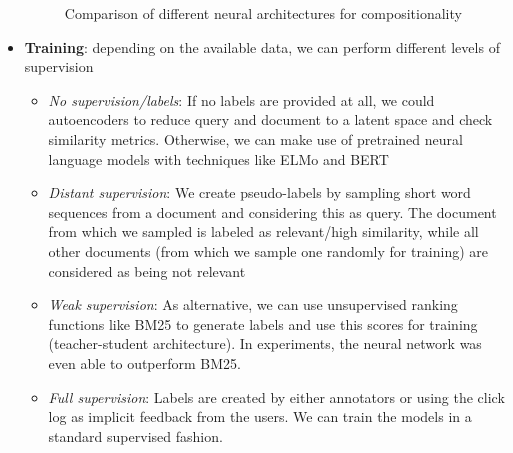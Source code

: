 \begin{itemize}
\begin{figure}[ht]
\begin{subfigure}[b]{0.3\textwidth}
			\label{img:neural_model_architecture_comparisons_two_dim_matching}
		\end{subfigure}
		\label{img:neural_model_architecture_comparisons}
		\caption{Comparison of different neural architectures for compositionality}
	\end{figure}
	\item \textbf{Training}: depending on the available data, we can perform different levels of supervision
	\begin{itemize}
		\item \textit{No supervision/labels}: If no labels are provided at all, we could autoencoders to reduce query and document to a latent space and check similarity metrics. Otherwise, we can make use of pretrained neural language models with techniques like ELMo and BERT
		\item \textit{Distant supervision}: We create pseudo-labels by sampling short word sequences from a document and considering this as query. The document from which we sampled is labeled as relevant/high similarity, while all other documents (from which we sample one randomly for training) are considered as being not relevant
		\item \textit{Weak supervision}: As alternative, we can use unsupervised ranking functions like BM25 to generate labels and use this scores for training (teacher-student architecture). In experiments, the neural network was even able to outperform BM25.
		\item \textit{Full supervision}: Labels are created by either annotators or using the click log as implicit feedback from the users. We can train the models in a standard supervised fashion. 
	\end{itemize}
\end{itemize}